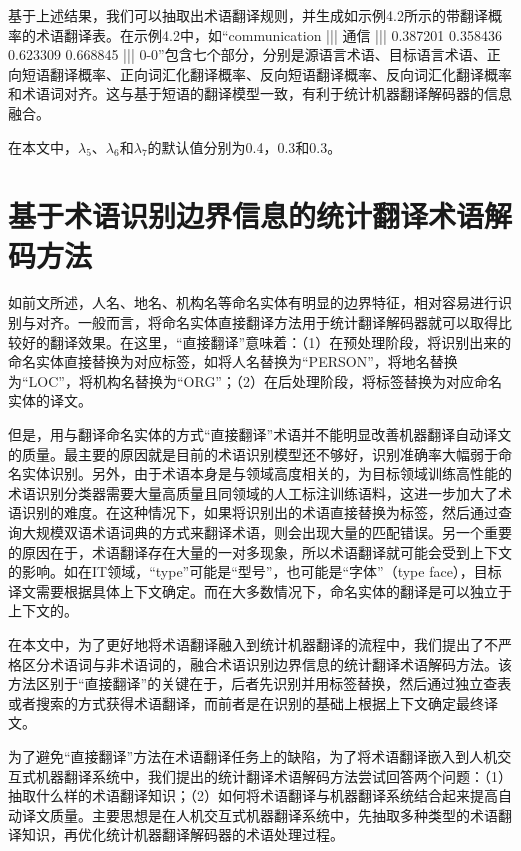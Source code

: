 基于上述结果，我们可以抽取出术语翻译规则，并生成如示例4.2所示的带翻译概率的术语翻译表。在示例4.2中，如“communication ||| 通信 ||| 0.387201 0.358436 0.623309 0.668845 ||| 0-0”包含七个部分，分别是源语言术语、目标语言术语、正向短语翻译概率、正向词汇化翻译概率、反向短语翻译概率、反向词汇化翻译概率和术语词对齐。这与基于短语的翻译模型一致，有利于统计机器翻译解码器的信息融合。

在本文中，$\lambda_5$、$\lambda_6$和$\lambda_7$的默认值分别为0.4，0.3和0.3。

\section{基于术语识别边界信息的统计翻译术语解码方法}

如前文所述，人名、地名、机构名等命名实体有明显的边界特征，相对容易进行识别与对齐。一般而言，将命名实体直接翻译方法用于统计翻译解码器就可以取得比较好的翻译效果。在这里，“直接翻译”意味着：（1）在预处理阶段，将识别出来的命名实体直接替换为对应标签，如将人名替换为“PERSON”，将地名替换为“LOC”，将机构名替换为“ORG”；（2）在后处理阶段，将标签替换为对应命名实体的译文。

但是，用与翻译命名实体的方式“直接翻译”术语并不能明显改善机器翻译自动译文的质量。最主要的原因就是目前的术语识别模型还不够好，识别准确率大幅弱于命名实体识别。另外，由于术语本身是与领域高度相关的，为目标领域训练高性能的术语识别分类器需要大量高质量且同领域的人工标注训练语料，这进一步加大了术语识别的难度。在这种情况下，如果将识别出的术语直接替换为标签，然后通过查询大规模双语术语词典的方式来翻译术语，则会出现大量的匹配错误。另一个重要的原因在于，术语翻译存在大量的一对多现象，所以术语翻译就可能会受到上下文的影响。如在IT领域，“type”可能是“型号”，也可能是“字体”（type face），目标译文需要根据具体上下文确定。而在大多数情况下，命名实体的翻译是可以独立于上下文的。

在本文中，为了更好地将术语翻译融入到统计机器翻译的流程中，我们提出了不严格区分术语词与非术语词的，融合术语识别边界信息的统计翻译术语解码方法。该方法区别于“直接翻译”的关键在于，后者先识别并用标签替换，然后通过独立查表或者搜索的方式获得术语翻译，而前者是在识别的基础上根据上下文确定最终译文。

为了避免“直接翻译”方法在术语翻译任务上的缺陷，为了将术语翻译嵌入到人机交互式机器翻译系统中，我们提出的统计翻译术语解码方法尝试回答两个问题：（1）抽取什么样的术语翻译知识；（2）如何将术语翻译与机器翻译系统结合起来提高自动译文质量。主要思想是在人机交互式机器翻译系统中，先抽取多种类型的术语翻译知识，再优化统计机器翻译解码器的术语处理过程。


